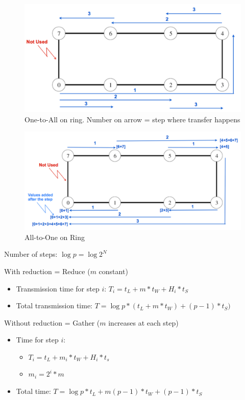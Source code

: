 \documentclass[11pt,a4paper]{report}
\begin{document}
\begin{figure}[H]
    \centering
    \includegraphics[width=0.7\linewidth]{img/comm_ring_one-to-all}
    \caption{One-to-All on ring. Number on arrow = step where transfer happens}
    \label{fig:commoneallring}
\end{figure}

\begin{figure}[H]
    \centering
    \includegraphics[width=0.7\linewidth]{img/comm_ring_all-to-one}
    \caption{All-to-One on Ring}
    \label{fig:commringall-to-one}
\end{figure}

Number of steps: $ \log{p} = \log{2^N} $

With reduction = Reduce ($m$ constant)

\begin{itemize}
    \item Transmission time for step $i$:
    $ T_{i} = t_{L} + m*t_{W} + H_{i} * t_{S} $
    
    \item Total transmission time:
    $ T = \log{p} * (t_{L} + m*t_{W}) + (p-1) * t_{S}) $
\end{itemize}

Without reduction = Gather ($m$ increases at each step)

\begin{itemize}
    \item Time for step $i$:
    \begin{itemize}
        \item $T_{i} = t_{L} + m_{i} * t_{W} + H_{i} * t_{s}$
        \item $m_{i} = 2^{i} * m$
    \end{itemize}
    \item Total time:
    $T=\log{p}*t_{L} + m(p-1)*t_{W} + (p-1) * t_{S}$
\end{itemize}
\end{document}
